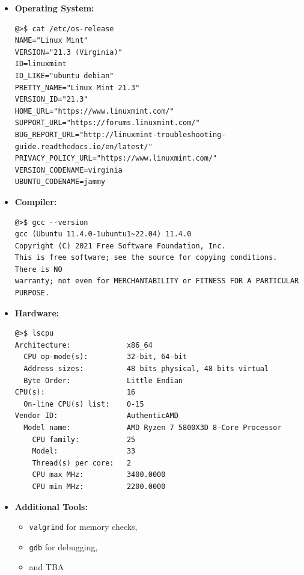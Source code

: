 \documentclass[11pt,a4paper]{report}
\theoremstyle{definitionstyle}
\begin{document}
\begin{itemize}
	\item \textbf{Operating System:} 
\begin{verbatim}
@>$ cat /etc/os-release
NAME="Linux Mint"
VERSION="21.3 (Virginia)"
ID=linuxmint
ID_LIKE="ubuntu debian"
PRETTY_NAME="Linux Mint 21.3"
VERSION_ID="21.3"
HOME_URL="https://www.linuxmint.com/"
SUPPORT_URL="https://forums.linuxmint.com/"
BUG_REPORT_URL="http://linuxmint-troubleshooting-guide.readthedocs.io/en/latest/"
PRIVACY_POLICY_URL="https://www.linuxmint.com/"
VERSION_CODENAME=virginia
UBUNTU_CODENAME=jammy

\end{verbatim}
	
	\item \textbf{Compiler:} 
\begin{verbatim}
@>$	gcc --version
gcc (Ubuntu 11.4.0-1ubuntu1~22.04) 11.4.0
Copyright (C) 2021 Free Software Foundation, Inc.
This is free software; see the source for copying conditions.  There is NO
warranty; not even for MERCHANTABILITY or FITNESS FOR A PARTICULAR PURPOSE.
\end{verbatim}
	\item \textbf{Hardware:} 
\begin{verbatim}
@>$ lscpu
Architecture:             x86_64
  CPU op-mode(s):         32-bit, 64-bit
  Address sizes:          48 bits physical, 48 bits virtual
  Byte Order:             Little Endian
CPU(s):                   16
  On-line CPU(s) list:    0-15
Vendor ID:                AuthenticAMD
  Model name:             AMD Ryzen 7 5800X3D 8-Core Processor
    CPU family:           25
    Model:                33
    Thread(s) per core:   2
    CPU max MHz:          3400.0000
    CPU min MHz:          2200.0000

\end{verbatim}
	\item \textbf{Additional Tools:} 
	\begin{itemize}
		\item \texttt{valgrind} for memory checks, 
		\item \texttt{gdb} for debugging, 
		\item and TBA %
	\end{itemize}
%

\end{itemize}
\end{document}
